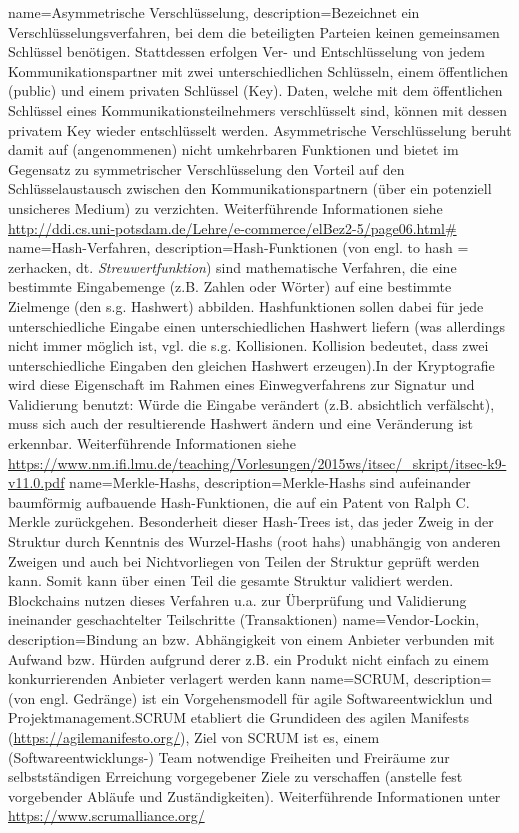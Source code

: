 {
    name=Asymmetrische Verschlüsselung,
    description={Bezeichnet ein Verschlüsselungsverfahren, bei dem die beteiligten Parteien keinen gemeinsamen Schlüssel benötigen. Stattdessen erfolgen Ver- und Entschlüsselung von jedem Kommunikationspartner mit zwei unterschiedlichen Schlüsseln, einem öffentlichen (public) und einem privaten Schlüssel (Key). Daten, welche mit dem öffentlichen Schlüssel eines Kommunikationsteilnehmers verschlüsselt sind, können mit dessen privatem Key wieder entschlüsselt werden. Asymmetrische Verschlüsselung beruht damit auf (angenommenen) nicht umkehrbaren Funktionen und bietet im Gegensatz zu symmetrischer Verschlüsselung den Vorteil auf den Schlüsselaustausch zwischen den Kommunikationspartnern (über ein potenziell unsicheres Medium) zu verzichten. Weiterführende Informationen siehe \url{http://ddi.cs.uni-potsdam.de/Lehre/e-commerce/elBez2-5/page06.html\#}}
}
{
    name=Hash-Verfahren,
    description={Hash-Funktionen (von engl. \glqq{}to hash\grqq{} = zerhacken, dt. \textit{Streuwertfunktion}) sind mathematische Verfahren, die eine bestimmte Eingabemenge (z.B. Zahlen oder Wörter) auf eine bestimmte Zielmenge (den s.g. Hashwert) abbilden. Hashfunktionen sollen dabei für jede unterschiedliche Eingabe einen unterschiedlichen Hashwert liefern (was allerdings nicht immer möglich ist, vgl. die s.g. Kollisionen. Kollision bedeutet, dass zwei unterschiedliche Eingaben den gleichen Hashwert erzeugen).In der Kryptografie wird diese Eigenschaft im Rahmen eines Einwegverfahrens zur Signatur und Validierung benutzt: Würde die Eingabe verändert (z.B. absichtlich verfälscht), muss sich auch der resultierende Hashwert ändern und eine Veränderung ist erkennbar. Weiterführende Informationen siehe \url{https://www.nm.ifi.lmu.de/teaching/Vorlesungen/2015ws/itsec/_skript/itsec-k9-v11.0.pdf}}
}
{
    name=Merkle-Hashs,
    description={Merkle-Hashs sind aufeinander baumförmig aufbauende Hash-Funktionen, die auf ein Patent von Ralph C. Merkle zurückgehen. Besonderheit dieser \glqq{}Hash-Trees\grqq{} ist, das jeder Zweig in der Struktur durch Kenntnis des Wurzel-Hashs (\glqq{}root hahs\grqq{}) unabhängig von anderen Zweigen und auch bei Nichtvorliegen von Teilen der Struktur geprüft werden kann. Somit kann über einen Teil die gesamte Struktur validiert werden. Blockchains nutzen dieses Verfahren u.a. zur Überprüfung und Validierung ineinander geschachtelter Teilschritte (Transaktionen)}
}
{
    name=Vendor-Lockin,
    description={Bindung an bzw. Abhängigkeit von einem Anbieter verbunden mit Aufwand bzw. Hürden aufgrund derer z.B. ein Produkt nicht einfach zu einem konkurrierenden Anbieter verlagert werden kann}
}
{
    name=SCRUM,
    description={(von engl. \glqq{}Gedränge\grqq{}) ist ein Vorgehensmodell für agile Softwareentwicklun und Projektmanagement.SCRUM etabliert die Grundideen des agilen Manifests (\url{https://agilemanifesto.org/}), Ziel von SCRUM ist es, einem (Softwareentwicklungs-) Team notwendige Freiheiten und Freiräume zur selbstständigen Erreichung vorgegebener Ziele zu verschaffen (anstelle fest vorgebender Abläufe und Zuständigkeiten). Weiterführende Informationen unter \url{https://www.scrumalliance.org/}}
}


